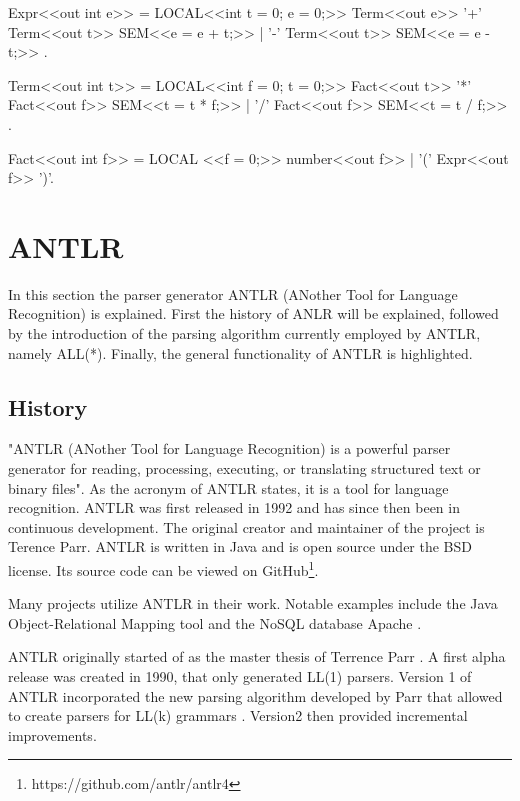 \begin{GenericCode}[float,numbers=none,caption=Attributed Grammar in Coco-2 for simple arithmetic expressions., label=lst:Coco2ATG]
Expr<<out int e>> =    LOCAL<<int t = 0; e = 0;>>
Term<<out e>>             
{ '+' Term<<out t>>    SEM<<e = e + t;>>
| '-' Term<<out t>>    SEM<<e = e - t;>>
}.

Term<<out int t>> =    LOCAL<<int f = 0; t = 0;>>
  Fact<<out t>>
  { '*' Fact<<out f>>  SEM<<t = t * f;>>
  | '/' Fact<<out f>>  SEM<<t = t / f;>>
  }.
  
Fact<<out int f>> =    LOCAL <<f = 0;>>
    number<<out f>>
  | '(' Expr<<out f>> ')'.

\end{GenericCode}

\section{ANTLR}

In this section the parser generator ANTLR (ANother Tool for Language Recognition) is explained. First the history of ANLR will be explained, followed by the introduction of the parsing algorithm currently employed by ANTLR, namely ALL(*). Finally, the general functionality of ANTLR is highlighted.  

\subsection{History}

"ANTLR (ANother Tool for Language Recognition) is a powerful parser generator for reading, processing, executing, or translating structured text or binary files". As the acronym of ANTLR states, it is a tool for language recognition. ANTLR was first released in 1992 and has since then been in continuous development. The original creator and maintainer of the project is Terence Parr. ANTLR is written in Java and is open source under the BSD license. Its source code can be viewed on GitHub\footnote{https://github.com/antlr/antlr4}. 

Many projects utilize ANTLR in their work. Notable examples include the Java Object-Relational Mapping tool \cite{HibernateWeb2024} and the NoSQL database Apache \textcite{Cassandra2024}.

ANTLR originally started of as the master thesis of Terrence Parr \parencite{PCCTSHistory1994}. A first alpha release was created in 1990, that only generated LL(1) parsers. Version 1 of ANTLR incorporated the new parsing algorithm developed by Parr that allowed to create parsers for LL(k) grammars \parencite{parrPhd1993}. Version2 then provided incremental improvements.   

